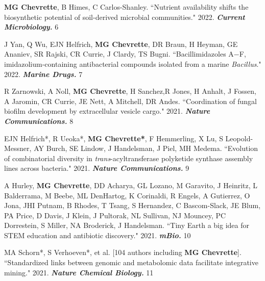 \begin{cvpubs}
\cvpub
{\textbf{MG Chevrette}, B Himes, C Carlos-Shanley. ``Nutrient availability shifts the biosynthetic potential of soil-derived microbial communities." 2022. \textit{\textbf{Current Microbiology.}} \textit{\textbf{}}}
{6}

\cvpub
{J Yan, Q Wu, EJN Helfrich, \textbf{MG Chevrette}, DR Braun, H Heyman,  GE Ananiev, SR Rajski, CR Currie, J Clardy, TS Bugni. ``Bacillimidazoles A−F, imidazolium-containing antibacterial compounds isolated from a marine \textit{Bacillus}." 2022. \textit{\textbf{Marine Drugs.}} \textit{\textbf{}}}
{7}

\cvpub
{R Zarnowski, A Noll, \textbf{MG Chevrette}, H Sanchez,R Jones, H Anhalt, J Fossen, A Jaromin, CR Currie, JE Nett, A Mitchell, DR Andes. ``Coordination of fungal biofilm development by extracellular vesicle cargo." 2021. \textit{\textbf{Nature Communications.}} \textit{\textbf{}}}
{8}

\cvpub
{EJN Helfrich*, R Ueoka*, \textbf{MG Chevrette*}, F Hemmerling, X Lu, S Leopold-Messner, AY Burch, SE Lindow, J Handelsman, J Piel, MH Medema. ``Evolution of combinatorial diversity in \textit{trans}-acyltransferase polyketide synthase assembly lines across bacteria." 2021. \textit{\textbf{Nature Communications.}} \textit{\textbf{}}}
{9}

\end{cvpubs} \begin{cvpubs}

\cvpub
{A Hurley, \textbf{MG Chevrette}, DD Acharya, GL Lozano, M Garavito, J Heinritz, L Balderrama, M Beebe, ML DenHartog, K Corinaldi, R Engels, A Gutierrez, O Jona, JHI Putnam, B Rhodes, T Tsang, S Hernandez, C Bascom-Slack, JE Blum, PA Price, D Davis, J Klein, J Pultorak, NL Sullivan, NJ Mouncey, PC Dorrestein, S Miller, NA Broderick, J Handelsman. ``Tiny Earth\: a big idea for STEM education and antibiotic discovery." 2021. \textit{\textbf{mBio.}} \textit{\textbf{}}}
{10}

\cvpub
{MA Schorn*, S Verhoeven*, et al. [104 authors including \textbf{MG Chevrette}]. ``Standardized links between genomic and metabolomic data facilitate integrative mining." 2021. \textit{\textbf{Nature Chemical Biology.}} \textit{\textbf{}}}
{11}


\end{cvpubs}
